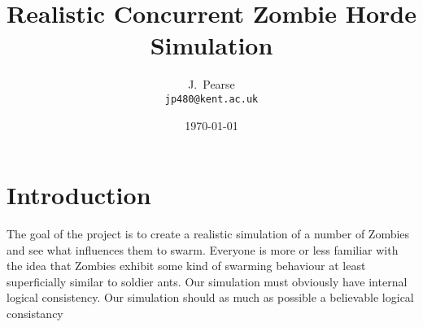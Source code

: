 \documentclass[a4paper,12pt]{article}
\begin{document}
\title{Realistic Concurrent Zombie Horde Simulation}
\author{J.~Pearse\\{\small\tt jp480@kent.ac.uk}}
\date{\today}

\maketitle

\section{Introduction}
The goal of the project is to create a realistic simulation of a number of Zombies and see what influences them to swarm.
Everyone is more or less familiar with the idea that Zombies exhibit some kind of swarming behaviour at least superficially similar to soldier ants.
Our simulation must obviously have internal logical consistency.
Our simulation should as much as possible a believable logical consistancy
\end{document}
